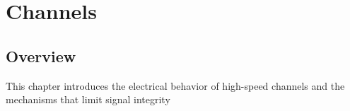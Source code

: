 \chapter{Channels}

\section{Overview}

This chapter introduces the electrical behavior of high-speed
channels and the mechanisms that limit signal integrity
\section{}



